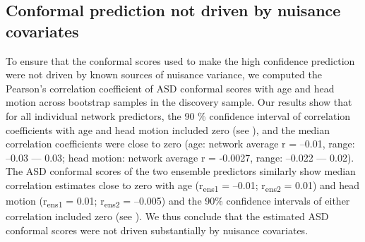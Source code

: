 \documentclass[9pt,lineno]{elife}
\begin{document}
\subsection{Conformal prediction not driven by nuisance covariates}
To ensure that the conformal scores used to make the high confidence prediction were not driven by known sources of nuisance variance, we computed the Pearson’s correlation coefficient of ASD conformal scores with age and head motion across bootstrap samples in the discovery sample. Our results show that for all individual network predictors, the 90 \% confidence interval of correlation coefficients with age and head motion included zero (see ), and the median correlation coefficients were close to zero (age: network average r = –0.01, range: –0.03 --- 0.03; head motion: network average r = -0.0027, range: –0.022 --- 0.02). The ASD conformal scores of the two ensemble predictors similarly show median correlation estimates close to zero with age (r\textsubscript{ens1} = –0.01; r\textsubscript{ens2} = 0.01) and head motion (r\textsubscript{ens1} = 0.01; r\textsubscript{ens2} = –0.005) and the 90\% confidence intervals of either correlation included zero (see ). We thus conclude that the estimated ASD conformal scores were not driven substantially by nuisance covariates. 
\end{document}
